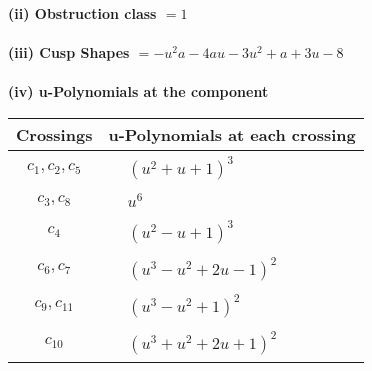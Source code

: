 \documentclass[1p]{elsarticle_modified}
\theoremstyle{definition}
\begin{document}
\flushleft \textbf{(ii) Obstruction class $= 1$}\\~\\
\flushleft \textbf{(iii) Cusp Shapes $= - u^2 a-4 a u-3 u^2+a+3 u-8$}\\~\\
\newpage\renewcommand{\arraystretch}{1}
\flushleft \textbf{(iv) u-Polynomials at the component}\newline \\
\begin{tabular}{m{50pt}|m{274pt}}
Crossings & \hspace{64pt}u-Polynomials at each crossing \\
\hline $$\begin{aligned}c_{1},c_{2},c_{5}\end{aligned}$$&$\begin{aligned}
&(u^2+u+1)^3
\end{aligned}$\\
\hline $$\begin{aligned}c_{3},c_{8}\end{aligned}$$&$\begin{aligned}
&u^6
\end{aligned}$\\
\hline $$\begin{aligned}c_{4}\end{aligned}$$&$\begin{aligned}
&(u^2- u+1)^3
\end{aligned}$\\
\hline $$\begin{aligned}c_{6},c_{7}\end{aligned}$$&$\begin{aligned}
&(u^3- u^2+2 u-1)^2
\end{aligned}$\\
\hline $$\begin{aligned}c_{9},c_{11}\end{aligned}$$&$\begin{aligned}
&(u^3- u^2+1)^2
\end{aligned}$\\
\hline $$\begin{aligned}c_{10}\end{aligned}$$&$\begin{aligned}
&(u^3+u^2+2 u+1)^2
\end{aligned}$\\
\hline
\end{tabular}\\~\\
\end{document}
